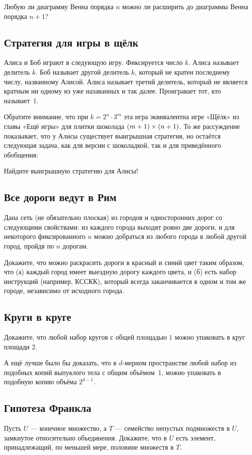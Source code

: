 Любую ли диаграмму Венна порядка $n$ можно ли расширить до диаграммы Венна порядка $n+1$?

\subsection*{Стратегия для игры в щёлк}

Алиса и Боб играют в следующую игру.
Фиксируется число $k$.
Алиса называет делитель $k$.
Боб называет другой делитель $k$, который не кратен последнему числу, названному Алисой.
Алиса называет третий делитель, который не является кратным ни одному из уже назаванных и так далее.
Проигравает тот, кто называет~1.

Обратите внимание, что при $k=2^{n}\cdot 3^{m}$ эта игра эквивалентна игре «Щёлк» из главы «Ещё игры» для плитки шоколада $(m+1)\z\times (n+1)$.
То же рассуждение показывает, что у Алисы существует выигрышная стратегия, но остаётся следующая задача, как для версии с шоколадкой, так и для приведённого обобщения:

Найдите выигрышную стратегию для Алисы!

\subsection*{Все дороги ведут в Рим}

Дана сеть (не обязательно плоская) из городов и односторонних дорог со следующими свойствами:
из каждого города выходят ровно две дороги, и для некоторого фиксированного $n$ можно добраться из любого города в любой другой город, пройдя по $n$ дорогам.

Докажите, что можно раскрасить дороги в красный и синий цвет таким образом, что (а) каждый город имеет выездную дорогу каждого цвета, и (б) есть набор инструкций (например, КССКК), который всегда заканчивается в одном и том же городе, независимо от исходного города.

\subsection*{Круги в круге}

Докажите, что любой набор кругов с общей площадью $1$ можно упаковать в круг площади $2$.

А ещё лучше было бы доказать, что в $d$-мерном пространстве любой набор из подобных копий выпуклого тела с общим объёмом~1, можно упаковать в подобную копию объёма $2^{d-1}$.

\subsection*{Гипотеза Франкла}

Пусть $U$ --- конечное множество, а $T$ --- семейство непустых подмножеств в $U$, замкнутое относительно объединения.
Докажите, что в $U$ есть элемент, принадлежащий, по меньшей мере, половине множеств в $T$.
